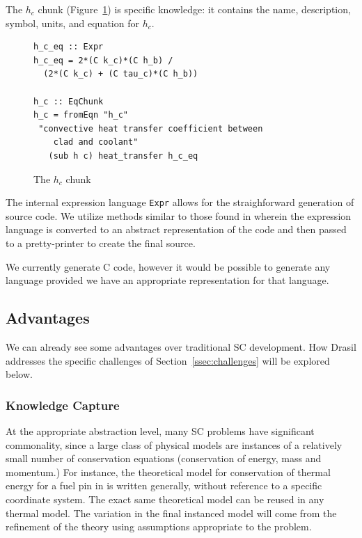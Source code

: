 \documentclass{sig-alternate-05-2015}
\newcommand{\lss}{Drasil}
\begin{document}
The $h_c$ chunk (Figure~\ref{fig:know_specific}) is specific
knowledge: it contains the name, description, symbol, units, and equation
for $h_c$.

\begin{figure}
\begin{lstlisting}[frame=single, showstringspaces=false, basicstyle=\small]
h_c_eq :: Expr
h_c_eq = 2*(C k_c)*(C h_b) /
  (2*(C k_c) + (C tau_c)*(C h_b))

h_c :: EqChunk
h_c = fromEqn "h_c" 
 "convective heat transfer coefficient between 
    clad and coolant"
   (sub h c) heat_transfer h_c_eq
\end{lstlisting}
\caption{The $h_c$ chunk}
\label{fig:know_specific}
\end{figure}

The internal expression language \lstinline|Expr|
allows for the straighforward generation of source code. We utilize methods
similar to those found in \cite{SAGA:DSL, Szymczak2014}
wherein the expression language is converted to an abstract representation of
the code and then passed to a pretty-printer to create the final source.

We currently generate C code, however it would be possible to generate any
language provided we have an appropriate representation for that language.

\subsection{Advantages} \label{ssec:advantages}

We can already see some advantages over traditional SC
development. How \lss{} addresses the specific challenges of
Section~\ref{ssec:challenges} will be explored below.

\subsubsection{Knowledge Capture} \label{sssec:adv_knowledge}

At the appropriate abstraction level, many SC problems have significant
commonality, since a large class of physical models are instances of a
relatively small number of conservation equations (conservation of energy, mass
and momentum.)  For instance, the theoretical model for conservation of thermal
energy for a fuel pin in \cite{SmithAndKoothoor2016} is written generally, without
reference to a specific coordinate system.  The exact same theoretical model can
be reused in any thermal model.  The variation in the final instanced model will
come from the refinement of the theory using assumptions appropriate to the
problem.
\end{document}
